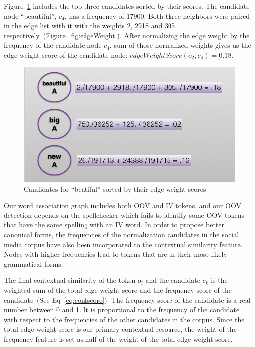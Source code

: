\documentclass[a4paper,onesided,12pt]{report}
\begin{document}
Figure~\ref{fig:contextscores} includes the top three candidates sorted by their scores. The candidate node ``beautiful'', $c_4$, has a frequency of 17900. Both three neighbors were paired in the edge list with it with the weights 2, 2918 and 305 respectively~(Figure~\ref{fig:edgeWeight}). After normalizing the edge weight by the frequency of the candidate node  $c_4$, sum of those normalized weights gives us the edge weight score of the candidate node: $edgeWeightScore(o_2,c_4) = 0.18$.



\begin{figure}[htb]
\begin{center}
\includegraphics[scale=0.5]{fig/contextScores}
\caption{Candidates for ``beatiful'' sorted by their edge weight scores}
\label{fig:contextscores}
\end{center}
\end{figure}

Our word association graph includes both OOV and IV tokens, and our OOV detection depends on the spellchecker which fails to identify some OOV tokens that have the same spelling with an IV word. In order to propose better canonical forms, the frequencies of the normalization candidates in the social media corpus have also been incorporated to the contextual similarity feature. Nodes with higher frequencies lead to tokens that are in their most likely grammatical forms.

The final contextual similarity of the token $o_i$ and the candidate $c_k$ is the weighted sum of the total edge weight score and the frequency score of the candidate~(See Eq~\ref{eq:contscore}). The frequency score of the candidate is a real number between 0 and 1. It is proportional to the frequency of the candidate with respect to the frequencies of the other candidates in the corpus. Since the total edge weight score is our primary contextual resource, the weight of the frequency feature is set as half of the weight of the total edge weight score.
\end{document}
